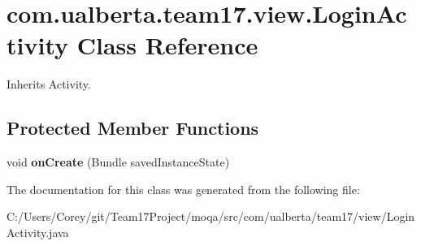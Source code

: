 \hypertarget{classcom_1_1ualberta_1_1team17_1_1view_1_1_login_activity}{\section{com.\+ualberta.\+team17.\+view.\+Login\+Activity Class Reference}
\label{classcom_1_1ualberta_1_1team17_1_1view_1_1_login_activity}
}


Inherits Activity.

\subsection*{Protected Member Functions}
\begin{DoxyCompactItemize}
\item 
\hypertarget{classcom_1_1ualberta_1_1team17_1_1view_1_1_login_activity_a4e30c7dc65bcdd331d953991bd8322bb}{void {\bfseries on\+Create} (Bundle saved\+Instance\+State)}\label{classcom_1_1ualberta_1_1team17_1_1view_1_1_login_activity_a4e30c7dc65bcdd331d953991bd8322bb}

\end{DoxyCompactItemize}


The documentation for this class was generated from the following file\+:\begin{DoxyCompactItemize}
\item 
C\+:/\+Users/\+Corey/git/\+Team17\+Project/moqa/src/com/ualberta/team17/view/Login\+Activity.\+java\end{DoxyCompactItemize}
